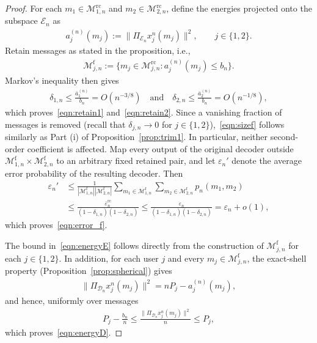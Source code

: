 \documentclass[11pt,onecolumn]{IEEEtran}
\newcommand{\calD}{\mathcal{D}}
\newcommand{\calE}{\mathcal{E}}
\newcommand{\calM}{\mathcal{M}}
\newcommand{\rmf}{\mathrm{f}}
\newcommand{\bara}{\bar{a}}
\newcommand{\eps}{\varepsilon}
\newcommand{\rc}{\mathrm{rc}}
\begin{document}
\begin{proof}
    For each $m_1\in\calM_{1,n}^\rc$ and $m_2\in\calM_{2,n}^\rc$, define the energies  projected onto the subspace $\calE_n$ as
\begin{align}
    a_j^{(n)}(m_j) := \|\Pi_{\calE_n}x_j^n(m_j) \|^2,\qquad j \in \{1,2\}.
\end{align}
Retain messages as stated in the proposition, i.e., 
\begin{align}
    \calM_{j,n}^\rmf := \big\{ m_j \in \calM_{j,n}^\rc: a_j^{(n)} (m_j)\le b_n\big\}. \label{eqn:energy_exp}
\end{align}
Markov's inequality then gives
\begin{align}
    \delta_{1,n}\le\frac{\bara_1^{(n)}}{b_n} = O(n^{-3/8})\quad \mbox{and}\quad\delta_{2,n}\le\frac{\bara_2^{(n)}}{b_n} = O(n^{-1/8}),
\end{align}
which proves~\eqref{eqn:retain1} and~\eqref{eqn:retain2}. Since a vanishing fraction of messages is removed (recall that $\delta_{j,n}\to0$ for $j \in \{1,2\}$),~\eqref{eqn:sizef} follows similarly as Part (i) of Proposition~\ref{prop:trim1}. In particular, neither second-order coefficient is affected. Map every output of the original decoder outside
$\calM_{1,n}^{\rmf}\times\calM_{2,n}^{\rmf}$ to an arbitrary fixed
retained pair, and let $\eps_n'$ denote the average error probability of
the resulting decoder. Then
\begin{align}
\eps_n'
&\le
\frac{1}{|\calM_{1,n}^{\rmf}||\calM_{2,n}^{\rmf}|}
\sum_{m_1\in\calM_{1,n}^{\rmf}}
\sum_{m_2\in\calM_{2,n}^{\rmf}}
p_n(m_1,m_2) \nonumber\\
&\le
\frac{\bar\eps_n^{\rc}}
     {(1-\delta_{1,n})(1-\delta_{2,n})}
\le
\frac{\eps_n}
     {(1-\delta_{1,n})(1-\delta_{2,n})}
=\eps_n+o(1),
\end{align}
which proves~\eqref{eqn:error_f}.

The bound in~\eqref{eqn:energyE} follows directly from the construction of $\calM_{j,n}^\rmf$ for each $j \in \{1,2\}$. In addition, for each user $j$ and every $m_j\in\calM_{j,n}^\rmf$, the exact-shell property (Proposition~\ref{prop:spherical}) gives 
\begin{align}
    \|\Pi_{\calD_n}x_j^n(m_j)\|^2=nP_j- a_j^{(n)}(m_j),
\end{align}
and hence, uniformly over messages 
\begin{align}
    P_j - \frac{b_n}{n}\le\frac{\|\Pi_{\calD_n}x_j^n(m_j)\|^2 }{n}\le P_j,
\end{align}
which proves~\eqref{eqn:energyD}.


\end{proof}
\end{document}
